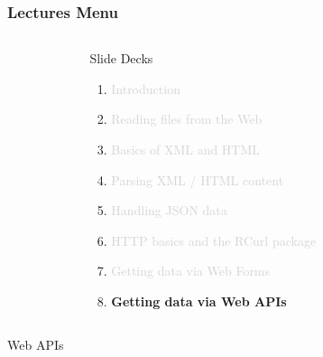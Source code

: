 \documentclass{beamer}\usepackage[]{graphicx}\usepackage[]{color}
\begin{document}
\begin{frame}
\frametitle{Lectures Menu}

\begin{columns}[t]
\begin{column}{0.1\textwidth}
\end{column}
\begin{column}{0.8\textwidth}
 \begin{block}{Slide Decks}
  \begin{enumerate}
   \item \textcolor{lightgray}{Introduction}
   \item \textcolor{lightgray}{Reading files from the Web}
   \item \textcolor{lightgray}{Basics of XML and HTML}
   \item \textcolor{lightgray}{Parsing XML / HTML content}
   \item \textcolor{lightgray}{Handling JSON data}
   \item \textcolor{lightgray}{HTTP basics and the RCurl package}
   \item \textcolor{lightgray}{Getting data via Web Forms}
   \item \textbf{Getting data via Web APIs}
  \end{enumerate}
 \end{block}
\end{column}
\begin{column}{0.1\textwidth}
\end{column}
\end{columns}

\end{frame}


\begin{frame}
 \begin{center}
  \Huge{\textcolor{mandarina}{Web APIs}}
 \end{center}
\end{frame}

\end{document}
